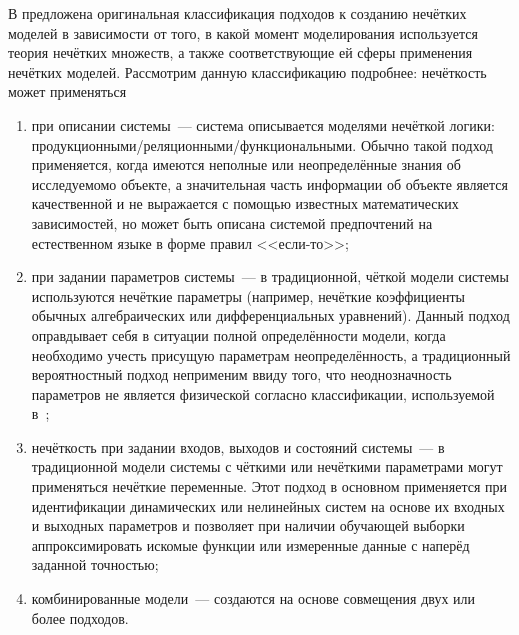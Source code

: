В \cite{Borisov_Fedulov} предложена оригинальная классификация подходов к созданию нечётких моделей в зависимости от того, в какой момент моделирования используется теория нечётких множеств, а также соответствующие ей сферы применения нечётких моделей. Рассмотрим данную классификацию подробнее: нечёткость может применяться
\begin{enumerate}
	\item при описании системы~--- система описывается моделями нечёткой логики: продукционными/реляционными/функциональными. Обычно такой подход применяется, когда имеются неполные или неопределённые знания об исследуемомо объекте, а значительная часть информации об объекте является качественной и не выражается с помощью известных математических зависимостей, но может быть описана системой предпочтений на естественном языке в форме правил <<если-то>>;
	\item при задании параметров системы~--- в традиционной, чёткой модели системы используются нечёткие параметры (например, нечёткие коэффициенты обычных алгебраических или дифференциальных уравнений). Данный подход оправдывает себя в ситуации полной определённости модели, когда необходимо учесть присущую параметрам неопределённость, а традиционный вероятностный подход неприменим ввиду того, что неоднозначность параметров не является физической согласно классификации, используемой в~\cite{Borisov_Alexeev_Msk};
	\item нечёткость при задании входов, выходов и состояний системы~--- в традиционной модели системы с чёткими или нечёткими параметрами могут применяться нечёткие переменные. Этот подход в основном применяется при идентификации динамических или нелинейных систем на основе их входных и выходных параметров и позволяет при наличии обучающей выборки аппроксимировать искомые функции или измеренные данные с наперёд заданной точностью;
	\item комбинированные модели~--- создаются на основе совмещения двух или более подходов.
\end{enumerate}


